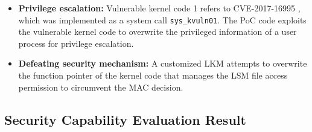 \begin{itemize}%
  
\item {\bf Privilege escalation:} Vulnerable kernel code 1 refers to
  CVE-2017-16995 \cite{CVE-2017-16995}, which was implemented as a system call
  \verb|sys_kvuln01|.
  The PoC code exploits the vulnerable kernel code to overwrite the privileged
  information of a user process for privilege escalation.

  \item {\bf Defeating security mechanism:} A customized LKM attempts to overwrite
  the function pointer of the kernel code that manages the LSM file access
  permission to circumvent the MAC decision.

\end{itemize}


  



\subsection{Security Capability Evaluation Result}
